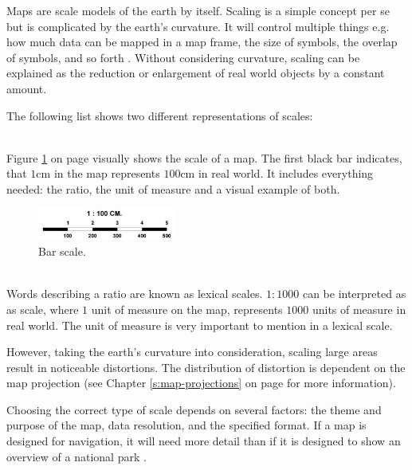 Maps are scale models of the earth by itself. Scaling is a simple concept per se but is complicated by the earth's curvature. It will control multiple things e.g. how much data can be mapped in a map frame, the size of symbols, the overlap of symbols, and so forth . Without considering curvature, scaling can be explained as the reduction or enlargement of real world objects by a constant amount.

The following list shows two different representations of scales:
\begin{enumerate}
 \hfill \\
Figure \ref{fig:bar-scale} on page \pageref{fig:bar-scale} visually shows the scale of a map. The first black bar indicates, that $1$cm in the map represents $100$cm in real world. It includes everything needed: the ratio, the unit of measure and a visual example of both.

\begin{figure}[!htb]
\centering
\includegraphics[width=0.4\textwidth,keepaspectratio]{images/methods/scalebar.jpg}
\caption[
    Bar scale.
]{Bar scale.}
\label{fig:bar-scale}
\end{figure}

 \hfill \\
Words describing a ratio are known as lexical scales. $1:1000$ can be interpreted as as scale, where $1$ unit of measure on the map, represents $1000$ units of measure in real world. The unit of measure is very important to mention in a lexical scale.
\end{enumerate}

However, taking the earth's curvature into consideration, scaling large areas result in noticeable distortions. The distribution of distortion is dependent on the map projection (see Chapter \ref{s:map-projections} on page \pageref{s:map-projections} for more information).

Choosing the correct type of scale depends on several factors: the theme and purpose of the map, data resolution, and the specified format. If a map is designed for navigation, it will need more detail than if it is designed to show an overview of a national park .